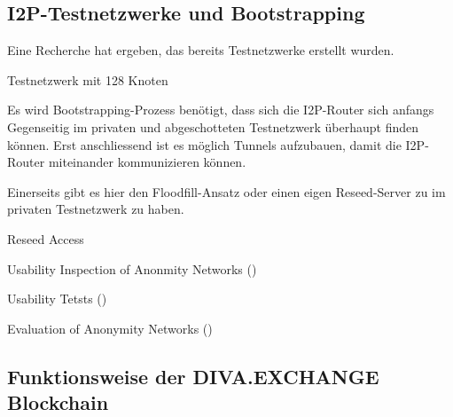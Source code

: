 %
%

\subsection{I2P-Testnetzwerke und Bootstrapping}

Eine Recherche hat ergeben, das bereits Testnetzwerke erstellt wurden.

Testnetzwerk mit 128 Knoten 
\cite{noauthor_how_2018}
\parencite[S. 25-26]{muller_analysis_2016}

Es wird Bootstrapping-Prozess benötigt, dass sich die I2P-Router sich anfangs Gegenseitig im privaten und abgeschotteten Testnetzwerk überhaupt finden können.
Erst anschliessend ist es möglich Tunnels aufzubauen, damit die I2P-Router miteinander kommunizieren können.


Einerseits gibt es hier den Floodfill-Ansatz oder einen eigen Reseed-Server zu im privaten Testnetzwerk zu haben.

Reseed Access
\cite{noauthor_i2p_nodate-7}

Usability Inspection of Anonmity Networks
(\cite{abou-tair_usability_2009})

Usability Tetsts
(\cite{schomburg_anonymity_2009})

Evaluation of Anonymity Networks
(\cite{timpanaro_evaluation_2015})

\subsection{Funktionsweise der DIVA.EXCHANGE Blockchain}\label{sec:divaxblockchain}


